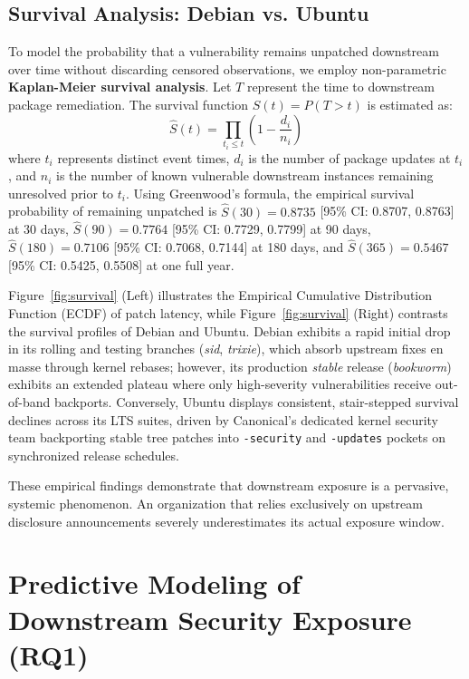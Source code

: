 \documentclass[final,5p,times,twocolumn]{elsarticle}
\begin{document}
\subsection{Survival Analysis: Debian vs. Ubuntu}
To model the probability that a vulnerability remains unpatched downstream over time without discarding censored observations, we employ non-parametric \textbf{Kaplan-Meier survival analysis}. Let $T$ represent the time to downstream package remediation. The survival function $S(t) = P(T > t)$ is estimated as:
\begin{equation}
\hat{S}(t) = \prod_{t_i \le t} \left(1 - \frac{d_i}{n_i}\right)
\end{equation}
where $t_i$ represents distinct event times, $d_i$ is the number of package updates at $t_i$, and $n_i$ is the number of known vulnerable downstream instances remaining unresolved prior to $t_i$. Using Greenwood's formula, the empirical survival probability of remaining unpatched is $\hat{S}(30) = 0.8735$ [95\% CI: 0.8707, 0.8763] at 30 days, $\hat{S}(90) = 0.7764$ [95\% CI: 0.7729, 0.7799] at 90 days, $\hat{S}(180) = 0.7106$ [95\% CI: 0.7068, 0.7144] at 180 days, and $\hat{S}(365) = 0.5467$ [95\% CI: 0.5425, 0.5508] at one full year.

Figure~\ref{fig:survival} (Left) illustrates the Empirical Cumulative Distribution Function (ECDF) of patch latency, while Figure~\ref{fig:survival} (Right) contrasts the survival profiles of Debian and Ubuntu. Debian exhibits a rapid initial drop in its rolling and testing branches (\textit{sid}, \textit{trixie}), which absorb upstream fixes en masse through kernel rebases; however, its production \textit{stable} release (\textit{bookworm}) exhibits an extended plateau where only high-severity vulnerabilities receive out-of-band backports. Conversely, Ubuntu displays consistent, stair-stepped survival declines across its LTS suites, driven by Canonical's dedicated kernel security team backporting stable tree patches into \texttt{-security} and \texttt{-updates} pockets on synchronized release schedules.

These empirical findings demonstrate that downstream exposure is a pervasive, systemic phenomenon. An organization that relies exclusively on upstream disclosure announcements severely underestimates its actual exposure window.

\section{Predictive Modeling of Downstream Security Exposure (RQ1)}
\label{sec:modeling}
\end{document}
